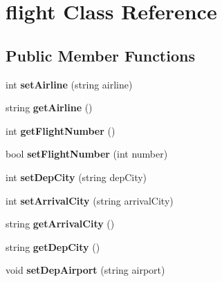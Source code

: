 \hypertarget{classflight}{
\section{flight Class Reference}
\label{classflight}
}
\subsection*{Public Member Functions}
\begin{DoxyCompactItemize}
\item 
\hypertarget{classflight_a9b9d3cb6dafe910496a7203e53c003bc}{
int {\bfseries setAirline} (string airline)}
\label{classflight_a9b9d3cb6dafe910496a7203e53c003bc}

\item 
\hypertarget{classflight_a9ddf1d9cbb17b5f4a86654780dc6f6db}{
string {\bfseries getAirline} ()}
\label{classflight_a9ddf1d9cbb17b5f4a86654780dc6f6db}

\item 
\hypertarget{classflight_a2e703a5681d3d5b9bbd0756e773dd611}{
int {\bfseries getFlightNumber} ()}
\label{classflight_a2e703a5681d3d5b9bbd0756e773dd611}

\item 
\hypertarget{classflight_ad96b9c1b09264926e46b6da8fc09be16}{
bool {\bfseries setFlightNumber} (int number)}
\label{classflight_ad96b9c1b09264926e46b6da8fc09be16}

\item 
\hypertarget{classflight_ae72ff1bc7737b1af276caea61f2064f2}{
int {\bfseries setDepCity} (string depCity)}
\label{classflight_ae72ff1bc7737b1af276caea61f2064f2}

\item 
\hypertarget{classflight_a2b85fd93fec21ae69e69672ade17792a}{
int {\bfseries setArrivalCity} (string arrivalCity)}
\label{classflight_a2b85fd93fec21ae69e69672ade17792a}

\item 
\hypertarget{classflight_a38c3274dcd1b9415a7d38cca4608453f}{
string {\bfseries getArrivalCity} ()}
\label{classflight_a38c3274dcd1b9415a7d38cca4608453f}

\item 
\hypertarget{classflight_a25b8b4c6cce5c8ae5e87fa2c5ffef5ac}{
string {\bfseries getDepCity} ()}
\label{classflight_a25b8b4c6cce5c8ae5e87fa2c5ffef5ac}

\item 
\hypertarget{classflight_a5a986561f3f4c327a8de2fe08531ba35}{
void {\bfseries setDepAirport} (string airport)}
\label{classflight_a5a986561f3f4c327a8de2fe08531ba35}


\end{DoxyCompactItemize}
